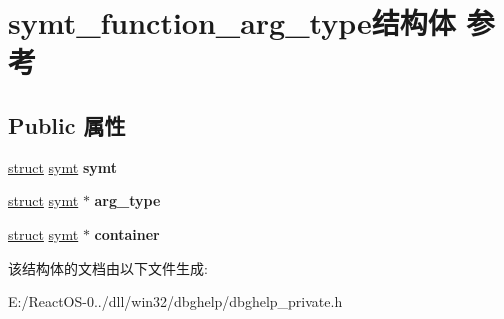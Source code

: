 \hypertarget{structsymt__function__arg__type}{}\section{symt\+\_\+function\+\_\+arg\+\_\+type结构体 参考}
\label{structsymt__function__arg__type}
\subsection*{Public 属性}
\begin{DoxyCompactItemize}
\item 
\mbox{\label{structsymt__function__arg__type_aed5179b8ca27d40177d4c98714c160ba}} 
\hyperlink{interfacestruct}{struct} \hyperlink{structsymt}{symt} {\bfseries symt}
\item 
\mbox{\label{structsymt__function__arg__type_a412e1ca2c2a0b2ce5379a189d75e70a3}} 
\hyperlink{interfacestruct}{struct} \hyperlink{structsymt}{symt} $\ast$ {\bfseries arg\+\_\+type}
\item 
\mbox{\label{structsymt__function__arg__type_a0b6c025b17fb01f3e9c873998c1ebe8c}} 
\hyperlink{interfacestruct}{struct} \hyperlink{structsymt}{symt} $\ast$ {\bfseries container}
\end{DoxyCompactItemize}


该结构体的文档由以下文件生成\+:\begin{DoxyCompactItemize}
\item 
E\+:/\+React\+O\+S-\/0../dll/win32/dbghelp/dbghelp\+\_\+private.\+h\end{DoxyCompactItemize}

